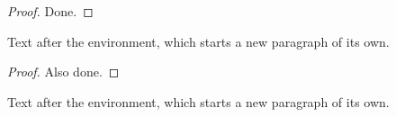 \documentclass[11pt]{article}
\begin{document}
\begin{proof}
Done.
\end{proof}

Text after the environment, which starts a new paragraph of its own.
\begin{proof}
Also done.
\end{proof}
\noindent Text after the environment, which starts a new paragraph of its own.
\end{document}
